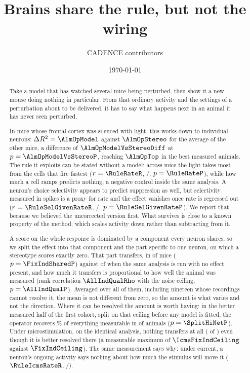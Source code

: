 \documentclass[11pt,letterpaper]{article}
\title{\bf Brains share the rule, but not the wiring}
\author{CADENCE contributors}
\date{\today}
\begin{document}
\maketitle

\begin{abstract}
\noindent
Take a model that has watched several mice being perturbed, then show it a new mouse
doing nothing in particular. From that ordinary activity and the settings of a
perturbation about to be delivered, it has to say what happens next in an animal it has
never seen perturbed.

In \AlmOpModelN{} mice whose frontal cortex was silenced with light, this works down to
individual neurons: $\Delta R^2 = \AlmOpModel$ against $\AlmOpStereo$ for the average of
the other mice, a difference of $\AlmOpModelVsStereoDiff$ at
$p = \AlmOpModelVsStereoP$, reaching $\AlmOpTop$ in the best measured animals. The rule
it exploits can be stated without a model: across \RuleRateN{} mice the light takes most
from the cells that fire fastest ($r = \RuleRateR$, \RuleRateNeg{}/\RuleRateN,
$p = \RuleRateP$), while how much a cell ramps predicts nothing, a negative control
inside the same analysis. A neuron's choice selectivity appears to predict suppression
as well, but selectivity measured in spikes is a proxy for rate and the effect vanishes
once rate is regressed out ($r = \RuleSelGivenRateR$,
\RuleSelGivenRateNeg{}/\RuleSelGivenRateN, $p = \RuleSelGivenRateP$). We report that
because we believed the uncorrected version first. What survives is close to a known
property of the method, which scales activity down rather than subtracting from it.

A score on the whole response is dominated by a component every neuron shares, so we
split the effect into that component and the part specific to one neuron, on which a
stereotype scores exactly zero. That part transfers, in \FixIndSharedPos{} of
\FixIndSharedN{} mice ($p = \FixIndSharedP$) against \FixIndNullPos{} of
\FixIndNullN{} when the same analysis is run with no effect present, and how much it
transfers is proportional to how well the animal was measured (rank correlation
$\AllIndQualRho$ with the noise ceiling, $p = \AllIndQualP$). Averaged over all of
them, including nineteen whose recordings cannot resolve it, the mean is not different
from zero, so the amount is what varies and not the direction. Where it can be resolved the amount is worth having: in the better measured half
of the first cohort, split on that ceiling before any model is fitted, the operator
recovers \SplitHiNetFrac\% of everything measurable in \SplitHiNetPos{} of
\SplitHiNetN{} animals ($p = \SplitHiNetP$). Under microstimulation, on the identical analysis, nothing
transfers at all (\IcmsFixIndSharedPos{} of \IcmsFixIndSharedN) even though it is
better resolved there (a measurable maximum of $\IcmsFixIndCeiling$ against
$\FixIndCeiling$). The same measurement says why: under current, a neuron's ongoing
activity says nothing about how much the stimulus will move it ($\RuleIcmsRateR$,
\RuleIcmsRateNeg{}/\RuleIcmsRateN).


\end{abstract}
\end{document}
